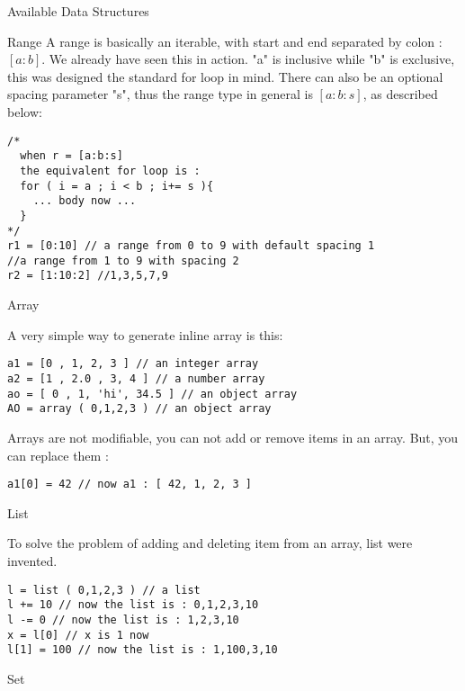 \begin{section}{Available Data Structures}

\begin{subsection}{Range}
A range is basically an iterable, with start and end separated by colon : $[a:b]$.
We already have seen this in action. "a" is inclusive while "b" is exclusive, 
this was designed the standard for loop in mind. There can also be an optional spacing parameter "s",
thus the range type in general is $[a:b:s]$, as described below:

\begin{lstlisting}[style=JexlStyle]
/* 
  when r = [a:b:s] 
  the equivalent for loop is :
  for ( i = a ; i < b ; i+= s ){
    ... body now ...  
  }
*/
r1 = [0:10] // a range from 0 to 9 with default spacing 1
//a range from 1 to 9 with spacing 2
r2 = [1:10:2] //1,3,5,7,9   
\end{lstlisting}
\end{subsection}

\begin{subsection}{Array}

A very simple way to generate inline array is this:

\begin{lstlisting}[style=JexlStyle]
a1 = [0 , 1, 2, 3 ] // an integer array 
a2 = [1 , 2.0 , 3, 4 ] // a number array 
ao = [ 0 , 1, 'hi', 34.5 ] // an object array   
AO = array ( 0,1,2,3 ) // an object array  
\end{lstlisting}
Arrays are not modifiable, you can not add or remove items in an array.
But, you can replace them :
\begin{lstlisting}[style=JexlStyle]
a1[0] = 42 // now a1 : [ 42, 1, 2, 3 ]
\end{lstlisting}
\end{subsection}

\begin{subsection}{List}

To solve the problem of adding and deleting item from an array, list were invented.
\begin{lstlisting}[style=JexlStyle]
l = list ( 0,1,2,3 ) // a list  
l += 10 // now the list is : 0,1,2,3,10
l -= 0 // now the list is : 1,2,3,10
x = l[0] // x is 1 now
l[1] = 100 // now the list is : 1,100,3,10 
\end{lstlisting}

\end{subsection}

\begin{subsection}{Set}


\end{subsection}
\end{section}
